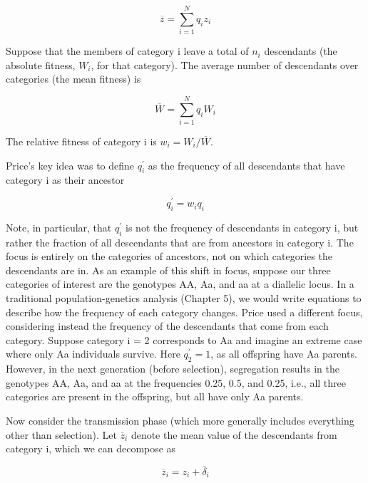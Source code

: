 \documentclass{article}
\begin{document}
\begin{equation}
\overline{z}=\sum_{i=1}^{N}q_{i}z_{i}
\tag{6.1}
\label{eq:6_1}
\end{equation}

Suppose that the members of category i leave a total of  $ n_{i} $ descendants (the absolute fitness,  $ W_{i} $, for that category). The average number of descendants over categories (the mean fitness) is

\begin{equation}
\overline{W}=\sum_{i=1}^{N}q_{i}W_{i}
\tag{6.2a}
\label{eq:6_2a}
\end{equation}

The relative fitness of category i is  $ w_{i} = W_{i}/\overline{W} $.

Price’s key idea was to define  $ q_{i}^{\prime} $ as the frequency of all descendants that have category i as their ancestor

\begin{equation}
q_{i}^{\prime}=w_{i}q_{i}
\tag{6.2b}
\label{eq:6_2b}
\end{equation}

Note, in particular, that  $ q_{i}^{\prime} $ is not the frequency of descendants in category i, but rather the fraction of all descendants that are from ancestors in category i. The focus is entirely on the categories of ancestors, not on which categories the descendants are in. As an example of this shift in focus, suppose our three categories of interest are the genotypes AA, Aa, and aa at a diallelic locus. In a traditional population-genetics analysis (Chapter 5), we would write equations to describe how the frequency of each category changes. Price used a different focus, considering instead the frequency of the descendants that come from each category. Suppose category i = 2 corresponds to Aa and imagine an extreme case where only Aa individuals survive. Here  $ q_{2}^{\prime} = 1 $, as all offspring have Aa parents. However, in the next generation (before selection), segregation results in the genotypes AA, Aa, and aa at the frequencies 0.25, 0.5, and 0.25, i.e., all three categories are present in the offspring, but all have only Aa parents.

Now consider the transmission phase (which more generally includes everything other than selection). Let  $ \overline{z}_{i} $ denote the mean value of the descendants from category i, which we can decompose as

\begin{equation}
\overline{z}_{i}=z_{i}+\overline{\delta}_{i}
\tag{6.3a}
\label{eq:6_3a}
\end{equation}
\end{document}
